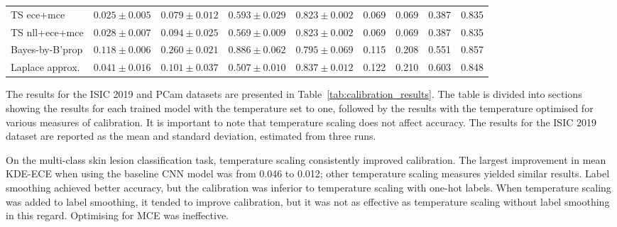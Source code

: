 \begin{table}[h!]
{\begin{tabular}{l|cccc|m{0.8cm}m{0.8cm}m{0.8cm}m{0.8cm}|}
			TS ece+mce & \multicolumn{1}{c|}{$0.025 \pm 0.005$}& \multicolumn{1}{c|}{$0.079 \pm 0.012$}& \multicolumn{1}{c|}{$0.593 \pm 0.029$}& \multicolumn{1}{c|}{$0.823 \pm 0.002$}& \multicolumn{1}{c|}{0.069} & \multicolumn{1}{c|}{0.069} & \multicolumn{1}{c|}{0.387} & \multicolumn{1}{c|}{0.835} \\
			TS nll+ece+mce & \multicolumn{1}{c|}{$0.028 \pm 0.007$}& \multicolumn{1}{c|}{$0.094 \pm 0.025$}& \multicolumn{1}{c|}{$0.569 \pm 0.009$}& \multicolumn{1}{c|}{$0.823 \pm 0.002$}& \multicolumn{1}{c|}{0.069} & \multicolumn{1}{c|}{0.069} & \multicolumn{1}{c|}{0.387} & \multicolumn{1}{c|}{0.835} \\ \hline \hline
			Bayes-by-B'prop & \multicolumn{1}{c|}{$0.118 \pm 0.006$}& \multicolumn{1}{c|}{$0.260 \pm 0.021$}& \multicolumn{1}{c|}{$0.886 \pm 0.062$}& \multicolumn{1}{c|}{$0.795 \pm 0.069$}& \multicolumn{1}{c|}{0.115} & \multicolumn{1}{c|}{0.208} & \multicolumn{1}{c|}{0.551} & \multicolumn{1}{c|}{0.857} \\ 
			Laplace approx.& \multicolumn{1}{c|}{$0.041 \pm 0.016$}& \multicolumn{1}{c|}{$0.101 \pm 0.037$}& \multicolumn{1}{c|}{$0.507 \pm 0.010$}& \multicolumn{1}{c|}{$0.837 \pm 0.012$}& \multicolumn{1}{c|}{0.122} & \multicolumn{1}{c|}{0.210} & \multicolumn{1}{c|}{0.603} & \multicolumn{1}{c|}{0.848} \\\hline
		\end{tabular}%
	}
\end{table}

The results for the ISIC 2019 and PCam datasets are presented in Table~\ref{tab:calibration_results}. The table is divided into sections showing the results for each trained model with the temperature set to one, followed by the results with the temperature optimised for various measures of calibration. It is important to note that temperature scaling does not affect accuracy. The results for the ISIC 2019 dataset are reported as the mean and standard deviation, estimated from three runs.

On the multi-class skin lesion classification task, temperature scaling consistently improved calibration. The largest improvement in mean KDE-ECE when using the baseline CNN model was from 0.046 to 0.012; other temperature scaling measures yielded similar results. Label smoothing achieved better accuracy, but the calibration was inferior to temperature scaling with one-hot labels. When temperature scaling was added to label smoothing, it tended to improve calibration, but it was not as effective as temperature scaling without label smoothing in this regard. Optimising for MCE was ineffective.

